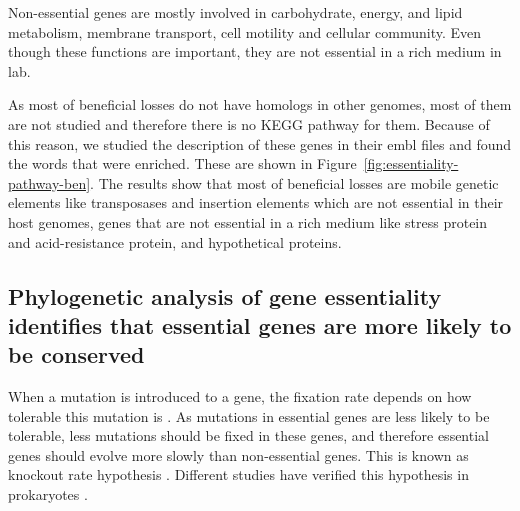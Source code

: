 \documentclass[12pt,letterpaper]{article}
\begin{document}
Non-essential genes are mostly involved in carbohydrate, energy, and lipid metabolism, membrane transport, cell motility and cellular community. Even though these functions are important, they are not essential in a rich medium in lab.

As most of beneficial losses do not have homologs in other genomes, most of them are not studied and therefore there is no KEGG pathway for them. Because of this reason, we studied the description of these genes in their embl files and found the words that were enriched. These are shown in Figure~\ref{fig:essentiality-pathway-ben}. The results show that most of beneficial losses are mobile genetic elements like transposases and insertion elements which are not essential in their host genomes, genes that are not essential in a rich medium like stress protein and acid-resistance protein, and hypothetical proteins.

\subsection{Phylogenetic analysis of gene essentiality identifies that essential genes are more likely to be conserved}
When a mutation is introduced to a gene, the fixation rate depends on how tolerable this mutation is \cite{wilson_biochemical_1977}. As mutations in essential genes are less likely to be tolerable, less mutations should be fixed in these genes, and therefore essential genes should evolve more slowly than non-essential genes. This is known as knockout rate hypothesis \cite{krylov_gene_2003}. Different studies have verified this hypothesis in prokaryotes \cite{jordan_essential_2002, gerdes_experimental_2003, rocha_analysis_2004, silander_constancy_2009}.
\end{document}
